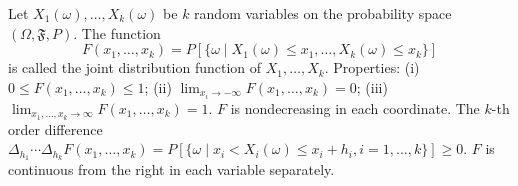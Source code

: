 Let $X_1(\omega), \ldots, X_k(\omega)$ be $k$ random variables on the probability space $(\Omega, \mathfrak{F}, P)$. The function
$$F(x_1, \ldots, x_k) = P[\{\omega \mid X_1(\omega) \leq x_1, \ldots, X_k(\omega) \leq x_k\}]$$
is called the joint distribution function of $X_1, \ldots, X_k$.
Properties: (i) $0 \leq F(x_1, \ldots, x_k) \leq 1$; (ii) $\lim_{x_i \to -\infty} F(x_1, \ldots, x_k) = 0$; (iii) $\lim_{x_1, \ldots, x_k \to \infty} F(x_1, \ldots, x_k) = 1$. $F$ is nondecreasing in each coordinate. The $k$-th order difference $\Delta_{h_1} \cdots \Delta_{h_k} F(x_1, \ldots, x_k) = P[\{\omega \mid x_i < X_i(\omega) \leq x_i + h_i, i = 1, \ldots, k\}] \geq 0$. $F$ is continuous from the right in each variable separately.
